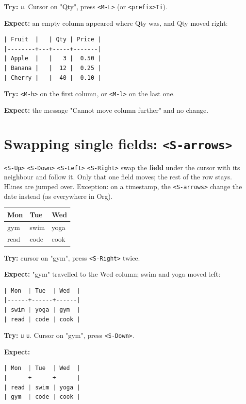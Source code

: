\textbf{Try:} \texttt{u}. Cursor on "Qty", press \texttt{<M-L>} (or \texttt{<prefix>Ti}).

\textbf{Expect:} an empty column appeared where Qty was, and Qty moved right:
\begin{verbatim}
| Fruit  |   | Qty | Price |
|--------+---+-----+-------|
| Apple  |   |   3 |  0.50 |
| Banana |   |  12 |  0.25 |
| Cherry |   |  40 |  0.10 |
\end{verbatim}

\textbf{Try:} \texttt{<M-h>} on the first column, or \texttt{<M-l>} on the last one.

\textbf{Expect:} the message "Cannot move column further" and no change.
\section{Swapping single fields: \texttt{<S-arrows>}}
\label{sec:orgd279195}
\texttt{<S-Up>} \texttt{<S-Down>} \texttt{<S-Left>} \texttt{<S-Right>} swap the \textbf{field} under the
cursor with its neighbour and follow it. Only that one field moves; the rest
of the row stays. Hlines are jumped over. Exception: on a timestamp, the
\texttt{<S-arrows>} change the date instead (as everywhere in Org).

\begin{table}[htbp]
\label{tab:org25f39bf}
\centering
\begin{tabular}{lll}
Mon & Tue & Wed\\
\hline
gym & swim & yoga\\
read & code & cook\\
\end{tabular}
\end{table}

\textbf{Try:} cursor on "gym", press \texttt{<S-Right>} twice.

\textbf{Expect:} "gym" travelled to the Wed column; swim and yoga moved left:
\begin{verbatim}
| Mon  | Tue  | Wed  |
|------+------+------|
| swim | yoga | gym  |
| read | code | cook |
\end{verbatim}

\textbf{Try:} \texttt{u} \texttt{u}. Cursor on "gym", press \texttt{<S-Down>}.

\textbf{Expect:}
\begin{verbatim}
| Mon  | Tue  | Wed  |
|------+------+------|
| read | swim | yoga |
| gym  | code | cook |
\end{verbatim}

